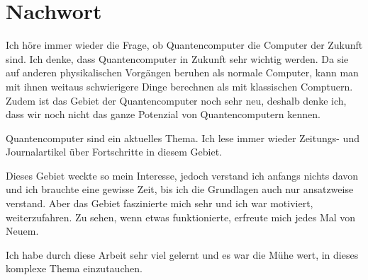 \chapter{Nachwort}
Ich höre immer wieder die Frage, ob Quantencomputer die Computer der Zukunft sind. Ich denke, dass Quantencomputer in Zukunft sehr wichtig werden. Da sie auf anderen physikalischen Vorgängen beruhen als normale Computer, kann man mit ihnen weitaus schwierigere Dinge berechnen als mit klassischen Comptuern. Zudem ist das Gebiet der Quantencomputer noch sehr neu, deshalb denke ich, dass wir noch nicht das ganze Potenzial von Quantencomputern kennen.

Quantencomputer sind ein aktuelles Thema. Ich lese immer wieder Zeitungs- und Journalartikel über Fortschritte in diesem Gebiet.

Dieses Gebiet weckte so mein Interesse, jedoch verstand ich anfangs nichts davon und ich brauchte eine gewisse Zeit, bis ich die Grundlagen auch nur ansatzweise verstand. Aber das Gebiet faszinierte mich sehr und ich war motiviert, weiterzufahren. Zu sehen, wenn etwas funktionierte, erfreute mich jedes Mal von Neuem.

Ich habe durch diese Arbeit sehr viel gelernt und es war die Mühe wert, in dieses komplexe Thema einzutauchen. 